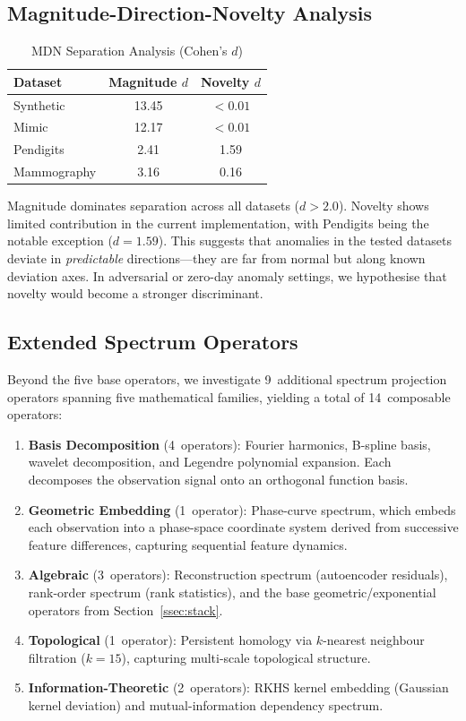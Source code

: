 \documentclass[journal]{IEEEtran}
\begin{document}
\subsection{Magnitude-Direction-Novelty Analysis}
\label{ssec:mdn_analysis}

\begin{table}[!t]
\centering
\caption{MDN Separation Analysis (Cohen's $d$)}
\label{tab:mdn}
\begin{tabular}{@{}lcc@{}}
\toprule
\textbf{Dataset} & \textbf{Magnitude $d$} & \textbf{Novelty $d$} \\
\midrule
Synthetic & 13.45 & $<0.01$ \\
Mimic & 12.17 & $<0.01$ \\
Pendigits & 2.41 & 1.59 \\
Mammography & 3.16 & 0.16 \\
\bottomrule
\end{tabular}
\end{table}

Magnitude dominates separation across all datasets ($d > 2.0$). Novelty shows limited contribution in the current implementation, with Pendigits being the notable exception ($d = 1.59$). This suggests that anomalies in the tested datasets deviate in \textit{predictable} directions---they are far from normal but along known deviation axes. In adversarial or zero-day anomaly settings, we hypothesise that novelty would become a stronger discriminant.

\subsection{Extended Spectrum Operators}
\label{ssec:extended}

Beyond the five base operators, we investigate 9~additional spectrum projection operators spanning five mathematical families, yielding a total of 14~composable operators:

\begin{enumerate}[leftmargin=*]
  \item \textbf{Basis Decomposition} (4~operators): Fourier harmonics, B-spline basis, wavelet decomposition, and Legendre polynomial expansion. Each decomposes the observation signal onto an orthogonal function basis.
  \item \textbf{Geometric Embedding} (1~operator): Phase-curve spectrum, which embeds each observation into a phase-space coordinate system derived from successive feature differences, capturing sequential feature dynamics.
  \item \textbf{Algebraic} (3~operators): Reconstruction spectrum (autoencoder residuals), rank-order spectrum (rank statistics), and the base geometric/exponential operators from Section~\ref{ssec:stack}.
  \item \textbf{Topological} (1~operator): Persistent homology via $k$-nearest neighbour filtration ($k{=}15$), capturing multi-scale topological structure.
  \item \textbf{Information-Theoretic} (2~operators): RKHS kernel embedding (Gaussian kernel deviation) and mutual-information dependency spectrum.
\end{enumerate}
\end{document}
